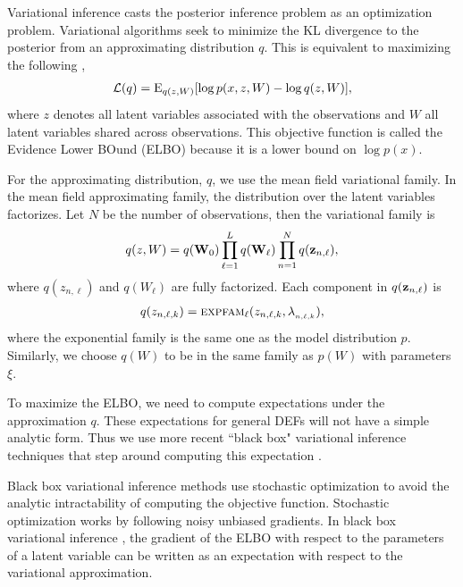 \documentclass[twoside]{article}
\begin{document}
Variational inference \citep{Jordan:1999} casts the posterior inference problem as 
an optimization problem. Variational algorithms seek to  minimize the KL divergence to the 
posterior from an approximating distribution $q$. This is equivalent to maximizing the following
\citep{Bishop:2006},
\begin{align*}
{\cal L} (q)= \textrm{E}_{q(z, W)}[\log p (x, z, W) - \log q (z, W)],
\end{align*}
where $z$ denotes all latent variables associated with the observations and 
$W$ all latent variables shared across observations.
This objective function is called the Evidence Lower BOund (ELBO) because it is a lower bound on
$\log p(x)$.

For the approximating distribution, $q$, we use the mean field variational family. 
In the mean field approximating family, the distribution over the latent variables factorizes.
Let $N$ be the number of observations, then
the variational family is
\begin{align*}
q(z, W) = q(\boldsymbol{\mathbf{W}}_{0}) \prod_{\ell=1}^L q(\boldsymbol{\mathbf{W}}_{\ell}) \prod_{n=1}^N q(\boldsymbol{\mathbf{z}}_{n, \ell}),
\end{align*}
where $q(z_{n, \ell})$ and $q(W_{\ell})$  are fully factorized. Each component
in $q(\boldsymbol{\mathbf{z}}_{n, \ell})$ is
\begin{align*}
q(z_{n, \ell, k}) = \textsc{expfam}_\ell(z_{n, \ell, k}, \lambda_{_{n,\ell, k}}),
\end{align*}
where the exponential family is the same one as the model distribution $p$. Similarly,
we choose $q(W)$ to be in the same family as $p(W)$ with parameters $\xi$. 

To maximize the ELBO, we need to compute expectations under the 
approximation $q$. These expectations for general DEFs will not have a simple
analytic form. Thus we use more recent ``black box" variational inference 
techniques that step around computing this expectation \citep{Wingate:2013, Salimans:2013, Ranganath:2014}.

Black box variational inference methods use stochastic optimization\citep{Robbins:1951}
to avoid the analytic intractability of computing the objective function. Stochastic optimization 
works by following noisy unbiased gradients. In black box variational inference \citep{Ranganath:2014}, the 
gradient of the ELBO with respect to the parameters of a latent variable can be written
as an expectation with respect to the variational approximation.
\end{document}
